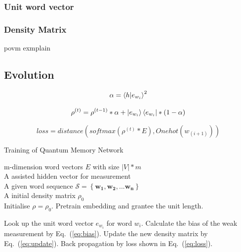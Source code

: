 \documentclass{sig-alternate-05-2015}
\newcommand{\bs}{\boldsymbol}
\begin{document}
\subsubsection{Unit word vector}
\subsubsection{Density Matrix}
povm exmplain
\subsection{Evolution}


\begin{equation}
\alpha = \braket{h|e_{w_i}}^2
\label{eq:bias}
\end{equation}

\begin{equation}
\rho^{(t)} = \rho^{(t-1)} * \alpha + \ket{e_{w_i}}\bra{e_{w_i}} *(1-\alpha)
\label{eq:update}
\end{equation}

\begin{equation}
loss = distance(softmax(\rho^{(t)}*E), Onehot(w_(i+1)))
\label{eq:loss}
\end{equation}


\begin{algorithm}[t]
\caption{Training of Quantum Memory Network}
\label{algo:framework}
\begin{algorithmic}[1]
\small
\REQUIRE
m-dimension word vectors $E$ with size $|V|*m$ \\
\hspace{4mm} A assisted hidden vector for measurement   \\
\hspace{4mm} A given word sequence $\mathcal{S}=\left\{\bs{w_1},\bs{w_2},...\bs{w_n}\right\}$ \\
\hspace{4mm} A initial density matrix $\rho _0$   \\

\STATE
Initialise $\rho=\rho _0$.
\STATE
Pretrain  embedding and grantee the unit length.

\REPEAT
{}
\STATE
Look up the unit word vector $e_{w_i}$ for word $w_i$.
\STATE
Calculate the bias of the weak measurement by Eq.~({\ref{eq:bias}}).
\STATE
Update the new density matrix  by Eq.~({\ref{eq:update}}).
\STATE
Back propagation by loss shown in  Eq.~({\ref{eq:loss}}).
\ENDFOR

\end{algorithmic}
\end{algorithm}
\end{document}

